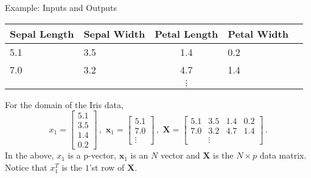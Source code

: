 \documentclass[10pt, handout]{beamer}
\begin{document}
\begin{frame}[fragile]{Example: Inputs and Outputs}

\begin{tabular}{llcll}
\textbf{Sepal Length} & \textbf{Sepal Width} & \textbf{Petal Length} & \textbf{Petal Width}\\ \hline
 	5.1 &	3.5 &	1.4 &	0.2          \\ \hline
7.0 	& 3.2  &	4.7 &	1.4      \\ \hline
&&$\vdots$
\end{tabular}
For the domain of the Iris data,
$$
x_1 = \left[\begin{matrix}
5.1 \\	3.5 \\	1.4 \\	0.2
\end{matrix}\right]\,,\,\,
\mathbf{x}_1 = \left[\begin{matrix}
5.1 \\	7.0 \\	\vdots
\end{matrix}\right]\,,\,\,
\mathbf{X} = \left[\begin{matrix}
5.1 &	3.5 &	1.4 &	0.2
\\
7.0 	& 3.2  &	4.7 &	1.4 
\\
&\vdots
\end{matrix}\right]\,.
$$
In the above, $x_1$ is a p-vector, $\mathbf{x}_1$ is an $N$ vector and $\mathbf{X}$ is the $N\times p$ data matrix. Notice that $x_1^T$ is the $1$'st row of $\mathbf{X}$.
\end{frame}
\end{document}
